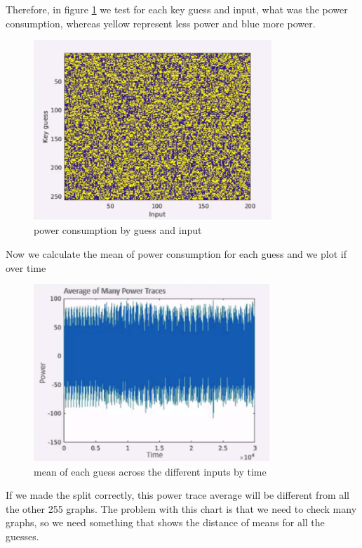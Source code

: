 Therefore, in figure \ref{fig:intensity_by_guess} we test for each key guess and input, what was the power consumption, whereas yellow represent less power and blue more power.
\begin{figure}[H]
\centering
\includegraphics[width=0.8\textwidth]{images/Lecture6/intensity_by_guess.png}
\caption{power consumption by guess and input}
\label{fig:intensity_by_guess}
\end{figure}
Now we calculate the mean of power consumption for each guess and we plot if over time
\begin{figure}[H]
\centering
\includegraphics[width=0.8\textwidth]{images/Lecture6/avg_of_many_traces.png}
\caption{mean of each guess across the different inputs by time}
\label{fig:avg_of_many_traces}
\end{figure}
If we made the split correctly, this power trace average will be different from all the other 255 graphs.
The problem with this chart is that we need to check many graphs, so we need something that shows the distance of means for all the guesses.
